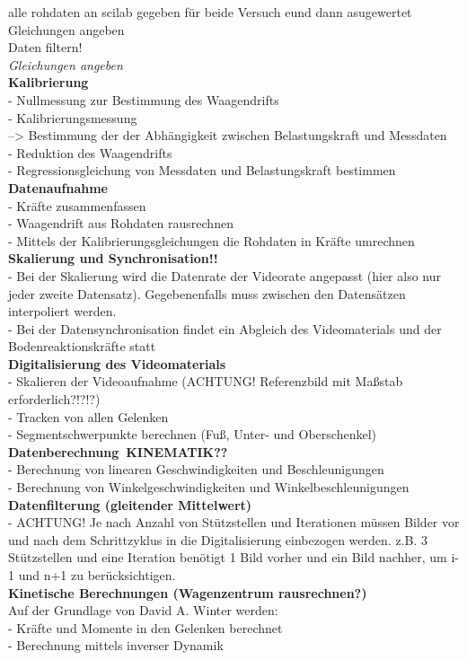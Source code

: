 alle rohdaten an scilab gegeben für beide Versuch eund dann asugewertet\\
Gleichungen angeben\\
Daten filtern!\\
\textit{Gleichungen angeben}\\
\textbf{Kalibrierung}\\
- Nullmessung zur Bestimmung des Waagendrifts\\
- Kalibrierungsmessung\\
--> Bestimmung der der Abhängigkeit zwischen Belastungskraft und Messdaten\\
- Reduktion des Waagendrifts\\
- Regressionsgleichung von Messdaten und Belastungskraft bestimmen\\
\textbf{Datenaufnahme}\\
- Kräfte zusammenfassen\\
- Waagendrift aus Rohdaten rausrechnen\\
- Mittels der Kalibrierungsgleichungen die Rohdaten in Kräfte umrechnen\\
\textbf{Skalierung und Synchronisation!!}\\
- Bei der Skalierung wird die Datenrate der Videorate angepasst (hier also nur jeder zweite Datensatz). Gegebenenfalls muss zwischen den Datensätzen interpoliert werden.\\
- Bei der Datensynchronisation findet ein Abgleich des Videomaterials und der Bodenreaktionskräfte statt\\
\textbf{Digitalisierung des Videomaterials}\\
- Skalieren der Videoaufnahme (ACHTUNG! Referenzbild mit Maßstab erforderlich?!?!?)\\
- Tracken von allen Gelenken\\
- Segmentschwerpunkte berechnen (Fuß, Unter- und Oberschenkel)\\
\textbf{Datenberechnung\ KINEMATIK??}\\
- Berechnung von linearen Geschwindigkeiten und Beschleunigungen\\
- Berechnung von Winkelgeschwindigkeiten und Winkelbeschleunigungen\\
\textbf{Datenfilterung (gleitender Mittelwert)}\\
- ACHTUNG! Je nach Anzahl von Stützstellen und Iterationen müssen Bilder vor und nach dem Schrittzyklus in die Digitalisierung einbezogen werden. z.B. 3 Stützstellen und eine Iteration benötigt 1 Bild vorher und ein Bild nachher, um i-1 und n+1 zu berücksichtigen.\\
\textbf{Kinetische Berechnungen (Wagenzentrum rausrechnen?)}\\
Auf der Grundlage von David A. Winter werden:\\
- Kräfte und Momente in den Gelenken berechnet\\
- Berechnung mittels inverser Dynamik\\